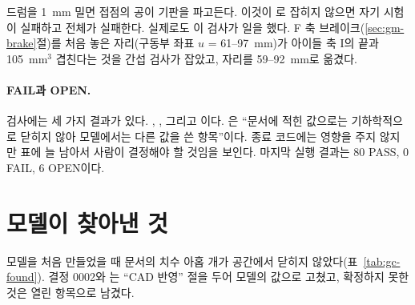 드럼을 1~mm 밀면 접점의 공이 기판을 파고든다. 이것이 로 잡히지 않으면 자기 시험이 실패하고 전체가 실패한다.
실제로도 이 검사가 일을 했다. F 축 브레이크(\ref{sec:gm-brake}절)를 처음 놓은 자리(구동부 좌표 $u$ = 61--97~mm)가 아이들
축 I의 끝과 105~mm$^3$ 겹친다는 것을 간섭 검사가 잡았고, 자리를 59--92~mm로 옮겼다.

\paragraph{FAIL과 OPEN.} 검사에는 세 가지 결과가 있다. , , 그리고 이다. 은
``문서에 적힌 값으로는 기하학적으로 닫히지 않아 모델에서는 다른 값을 쓴 항목''이다. 종료 코드에는 영향을 주지 않지만
표에 늘 남아서 사람이 결정해야 할 것임을 보인다. 마지막 실행 결과는 80 PASS, 0 FAIL, 6 OPEN이다.

\section{모델이 찾아낸 것}\label{sec:gc-found}

모델을 처음 만들었을 때 문서의 치수 아홉 개가 공간에서 닫히지 않았다(표~\ref{tab:gc-found}). 결정 0002와 는
``CAD 반영'' 절을 두어 모델의 값으로 고쳤고, 확정하지 못한 것은 열린 항목으로 남겼다.

